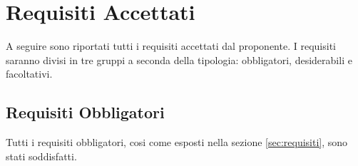 
\section{Requisiti Accettati}
\label{sec:requisiti_accettati}
A seguire sono riportati tutti i requisiti accettati dal proponente. I requisiti saranno divisi in tre gruppi a seconda della tipologia: obbligatori, desiderabili e facoltativi.

\subsection{Requisiti Obbligatori}
Tutti i requisiti obbligatori, cosi come esposti nella sezione \ref{sec:requisiti}, sono stati soddisfatti.

